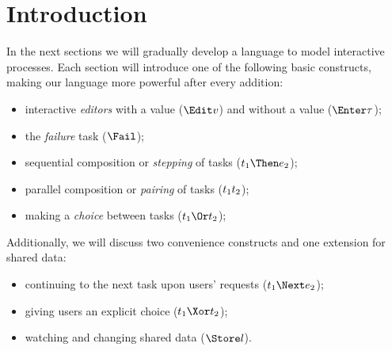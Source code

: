 
\section{Introduction}

In the next sections we will gradually develop a language to model interactive processes.
Each section will introduce one of the following basic constructs,
making our language more powerful after every addition:
\begin{itemize}
  \item interactive \emph{editors} with a value ($\Edit v$) and without a value ($\Enter \tau$);
  \item the \emph{failure} task ($\Fail$);
  \item sequential composition or \emph{stepping} of tasks ($t_1 \Then e_2$);
  \item parallel composition or \emph{pairing} of tasks ($t_1 \relax t_2$);
  \item making a \emph{choice} between tasks ($t_1 \Or t_2$);
\end{itemize}
Additionally, we will discuss two convenience constructs and one extension for shared data:
\begin{itemize}
  \item continuing to the next task upon users' requests ($t_1 \Next e_2$);
  \item giving users an explicit choice ($t_1 \Xor t_2$);
  \item watching and changing shared data ($\Store l$).
\end{itemize}

